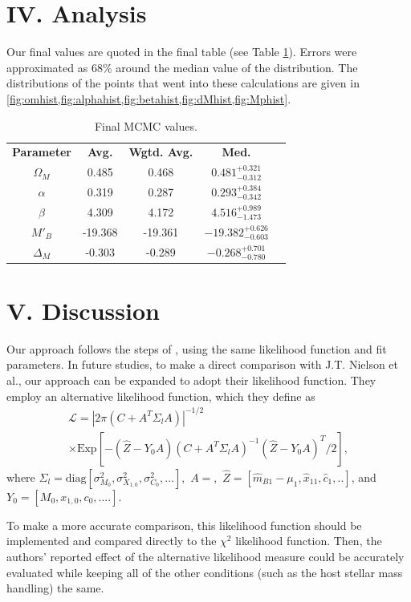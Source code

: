 \documentclass[aps,prl,reprint]{revtex4-1}
\begin{document}
\section{IV. Analysis} 
Our final values are quoted in the final table (see Table \ref{tblv}). Errors were approximated as 68\% around the median value of the distribution. The distributions of the points that went into these calculations are given in \cref{fig:omhist,fig:alphahist,fig:betahist,fig:dMhist,fig:Mphist}.
\begin{table}
\begin{center}
\def\arraystretch{1.5}
\begin{tabular}{ |c|c|c|c|c| } 
 \hline
 \textbf{Parameter} & \textbf{Avg.} & \textbf{Wgtd. Avg.} & \textbf{Med.} \\ 
 $\Omega_M$ & 0.485 & 0.468 & $0.481^{+0.321}_{-0.312}$\\ 
 $\alpha$ & 0.319 & 0.287 & $0.293^{+0.384}_{-0.342}$\\ 
 $\beta$ & 4.309 & 4.172 &  $4.516^{+0.989}_{-1.473}$\\ 
 $M'_B$ & -19.368 & -19.361 & $-19.382^{+0.626}_{-0.603}$ \\ 
$\Delta_M$ & -0.303 &-0.289 & $-0.268^{+0.701}_{-0.780}$ \\
 \hline
\end{tabular}
 \caption{Final MCMC values.}\label{tblv}

\end{center}
\end{table}
\section{V. Discussion}
Our approach follows the steps of \cite{sdss}, using the same likelihood function and fit parameters. In future studies, to make a direct comparison with J.T. Nielson et al., our approach can be expanded to adopt their likelihood function. 
They employ an alternative likelihood function, which they define as \begin{align*}\mathscr{L} = |2\pi(C+A^T \Sigma_l A)|^{-1/2}\; \\
\times \text{Exp}[-(\hat{Z}-Y_0A)(C+A^T\Sigma_lA)^{-1}(\hat{Z}-Y_0A)^T/2],\end{align*} where $\Sigma_l = \text{diag}[\sigma_{M_0}^2,\sigma_{X_{1,0}}^2,\sigma_{C_0}^2,...],$ $A = ,$ $\hat{Z} = [\hat{m}_{B1}-\mu_1, \hat{x}_{11},\hat{c}_1,..]$, and $Y_0 = [M_0,x_{1,0},c_0,....]$. 
\par To make a more accurate comparison, this likelihood function should be implemented and compared directly to the $\chi^2$ likelihood function. Then, the authors' reported effect of the alternative likelihood measure could be accurately evaluated while keeping all of the other conditions (such as the host stellar mass handling) the same. 


 
 
\end{document}
